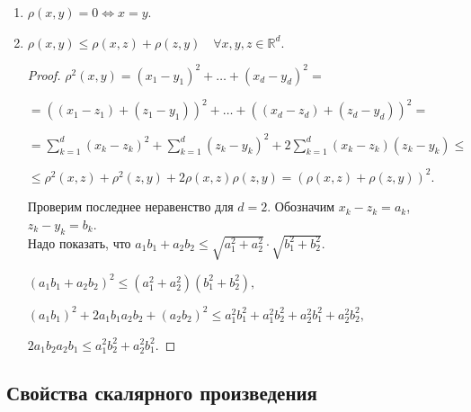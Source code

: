 \documentclass[12pt,a4paper]{report}
\begin{document}
\begin{enumerate}
    \item $\rho(x,y)=0\iff x=y$.
    \item $\rho(x,y)\leq\rho(x,z)+\rho(z,y)\quad \forall x,y,z\in\mathbb{R}^d$.

\begin{proof}
    \noindent
        $\displaystyle
        \rho^2(x,y)
        =(x_1-y_1)^2+\ldots+(x_d-y_d)^2=$%

    \noindent
       $=((x_1-z_1)+(z_1-y_1))^2+\ldots+((x_d-z_d)+(z_d-y_d))^2=
        $%

    \noindent
        $\displaystyle
        =\sum_{k=1}^d (x_k-z_k)^2+\sum_{k=1}^d(z_k-y_k)^2
        +2\sum_{k=1}^d(x_k-z_k)(z_k-y_k)\leq
        $%

    \noindent
        $\displaystyle
        \leq \rho^2(x,z)+\rho^2(z,y)+2\rho(x,z)\rho(z,y)
        =(\rho(x,z)+\rho(z,y))^2.
        $%

    Проверим последнее неравенство для $d=2$. Обозначим $x_k-z_k=a_k$, $z_k-y_k=b_k$. \\
    Надо показать, что $\displaystyle a_1b_1+a_2b_2 \leq \sqrt{a_1^2+a_2^2}\cdot \sqrt{b_1^2+b_2^2}.$%

    \noindent
        $\displaystyle
        (a_1b_1+a_2b_2)^2
        \leq(a_1^2+a_2^2)(b_1^2+b_2^2),$

    \noindent
        $\displaystyle
        (a_1b_1)^2+2a_1b_1a_2b_2+(a_2b_2)^2
        \leq a_1^2b_1^2+a_1^2b_2^2+a_2^2b_1^2+a_2^2b_2^2,$

    \noindent
        $\displaystyle
        2a_1b_2a_2b_1
        \leq a_1^2b_2^2+a_2^2b_1^2.$
        
\end{proof}
\end{enumerate}


\subsection{Свойства скалярного произведения}
\end{document}
